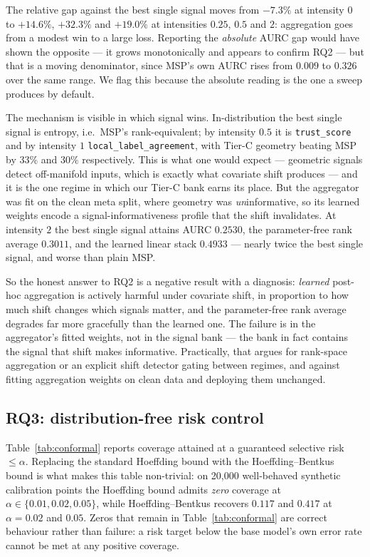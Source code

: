 \documentclass[conference]{IEEEtran}
\begin{document}
The relative gap against the best single signal moves from $-7.3\%$ at
intensity $0$ to $+14.6\%$, $+32.3\%$ and $+19.0\%$ at intensities
$0.25$, $0.5$ and $2$: aggregation goes from a modest win to a large
loss. Reporting the \emph{absolute} AURC gap would have shown the
opposite --- it grows monotonically and appears to confirm RQ2 --- but
that is a moving denominator, since MSP's own AURC rises from $0.009$ to
$0.326$ over the same range. We flag this because the absolute reading is
the one a sweep produces by default.

The mechanism is visible in which signal wins. In-distribution the best
single signal is entropy, i.e.\ MSP's rank-equivalent; by intensity
$0.5$ it is \texttt{trust\_score} and by intensity $1$
\texttt{local\_label\_agreement}, with Tier-C geometry beating MSP by
$33\%$ and $30\%$ respectively. This is what one would expect --- geometric
signals detect off-manifold inputs, which is exactly what covariate shift
produces --- and it is the one regime in which our Tier-C bank earns its
place. But the aggregator was fit on the clean meta split, where geometry
was \emph{un}informative, so its learned weights encode a
signal-informativeness profile that the shift invalidates. At intensity
$2$ the best single signal attains AURC $0.2530$, the parameter-free rank
average $0.3011$, and the learned linear stack $0.4933$ --- nearly twice
the best single signal, and worse than plain MSP.

So the honest answer to RQ2 is a negative result with a diagnosis:
\emph{learned} post-hoc aggregation is actively harmful under covariate
shift, in proportion to how much shift changes which signals matter, and
the parameter-free rank average degrades far more gracefully than the
learned one. The failure is in the aggregator's fitted weights, not in
the signal bank --- the bank in fact contains the signal that shift makes
informative. Practically, that argues for rank-space aggregation or an
explicit shift detector gating between regimes, and against fitting
aggregation weights on clean data and deploying them unchanged.



\subsection{RQ3: distribution-free risk control}

Table~\ref{tab:conformal} reports coverage attained at a guaranteed
selective risk $\le \alpha$. Replacing the standard Hoeffding bound with
the Hoeffding--Bentkus bound is what makes this table non-trivial: on
20{,}000 well-behaved synthetic calibration points the Hoeffding bound
admits \emph{zero} coverage at $\alpha \in \{0.01, 0.02, 0.05\}$, while
Hoeffding--Bentkus recovers $0.117$ and $0.417$ at $\alpha = 0.02$ and
$0.05$. Zeros that remain in Table~\ref{tab:conformal} are correct
behaviour rather than failure: a risk target below the base model's own
error rate cannot be met at any positive coverage.
\end{document}
